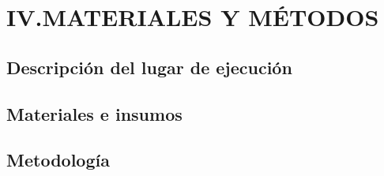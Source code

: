 \chapter{IV.MATERIALES Y MÉTODOS}
\section{Descripción del lugar de ejecución}

\section{Materiales e insumos}

\section{Metodología}
